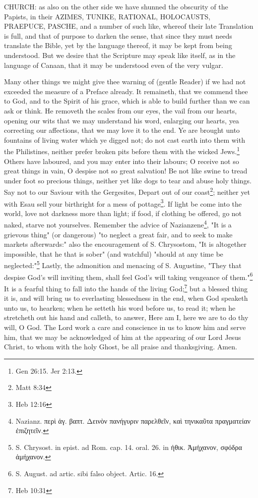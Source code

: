 CHURCH: as also on the other side we have shunned the obscurity of the Papists, in their AZIMES, TUNIKE, RATIONAL, HOLOCAUSTS, PRAEPUCE, PASCHE, and a number of such like, whereof their late Translation is full, and that of purpose to darken the sense, that since they must needs translate the Bible, yet by the language thereof, it may be kept from being understood. But we desire that the Scripture may speak like itself, as in the language of Canaan, that it may be understood even of the very vulgar.

Many other things we might give thee warning of (gentle Reader) if we had not exceeded the measure of a Preface already. It remaineth, that we commend thee to God, and to the Spirit of his grace, which is able to build further than we can ask or think. He removeth the scales from our eyes, the vail from our hearts, opening our wits that we may understand his word, enlarging our hearts, yea correcting our affections, that we may love it to the end. Ye are brought unto fountains of living water which ye digged not; do not cast earth into them with the Philistines, neither prefer broken pits before them with the wicked Jews.\footnote{Gen 26:15. Jer 2:13.} Others have laboured, and you may enter into their labours; O receive not so great things in vain, O despise not so great salvation! Be not like swine to tread under foot so precious things, neither yet like dogs to tear and abuse holy things. Say not to our Saviour with the Gergesites, Depart out of our coast\footnote{Matt 8:34}; neither yet with Esau sell your birthright for a mess of pottage\footnote{Heb 12:16}. If light be come into the world, love not darkness more than light; if food, if clothing be offered, go not naked, starve not yourselves. Remember the advice of Nazianzene\footnote{Nazianz. \foreignlanguage{greek}{περὶ ἁγ. βαπτ. Δεινὸν πανήγυριν παρελθεῖν, καὶ τηνικαῦτα πραγματείαν ἐπιζητεῖν.}}, "It is a grievous thing" (or dangerous) "to neglect a great fair, and to seek to make markets afterwards:" also the encouragement of S. Chrysostom, "It is altogether impossible, that he that is sober" (and watchful) "should at any time be neglected:"\footnote{S. Chrysost. in epist. ad Rom. cap. 14. oral. 26. in \foreignlanguage{greek}{ἠθικ. Ἀμήχανον, σφόδρα ἀμήχανον.}} Lastly, the admonition and menacing of S. Augustine, "They that despise God's will inviting them, shall feel God's will taking vengeance of them."\footnote{S. August. ad artic. sibi falso object. Artic. 16.} It is a fearful thing to fall into the hands of the living God;\footnote{Heb 10:31} but a blessed thing it is, and will bring us to everlasting blessedness in the end, when God speaketh unto us, to hearken; when he setteth his word before us, to read it; when he stretcheth out his hand and calleth, to answer, Here am I, here we are to do thy will, O God. The Lord work a care and conscience in us to know him and serve him, that we may be acknowledged of him at the appearing of our Lord Jesus Christ, to whom with the holy Ghost, be all praise and thanksgiving. Amen.
\setcounter{footnote}{0}
